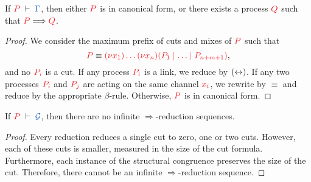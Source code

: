 \documentclass[UKenglish]{llncs}
\begin{document}
\begin{theorem}[Progress]\label{thm:hcp-progress}
  If $\seq[P]{\Gamma}$, then either $\tm{P}$ is in canonical form, or there exists a process $\tm{Q}$ such that $\tm{P}\Longrightarrow\tm{Q}$.
\end{theorem} 
\begin{proof}
  We consider the maximum prefix of cuts and mixes of $\tm{P}$ such that
  \[
  \tm{P} \equiv \tm{\piNew{x_1}{\dots\piNew{x_n}{(P_1 \ppar \dots \ppar P_{n+m+1})}}},
  \]
  and no $\tm{P_i}$ is a cut. If any process $\tm{P_i}$ is a link, we reduce by $({\leftrightarrow})$. If any two processes $\tm{P_i}$ and $\tm{P_j}$ are acting on the same channel $\tm{x_i}$, we rewrite by $\equiv$ and reduce by the appropriate $\beta$-rule. Otherwise, $\tm{P}$ is in canonical form.
\end{proof}
\begin{theorem}[Termination]\label{thm:hcp-termination}
  If $\seq[P]{\mathcal{G}}$, then there are no infinite $\Longrightarrow$-reduction sequences.
\end{theorem} 
\begin{proof}
  Every reduction reduces a single cut to zero, one or two cuts. However, each of these cuts is smaller, measured in the size of the cut formula. Furthermore, each instance of the structural congruence preserves the size of the cut. Therefore, there cannot be an infinite $\Longrightarrow$-reduction sequence.
\end{proof}
\end{document}

